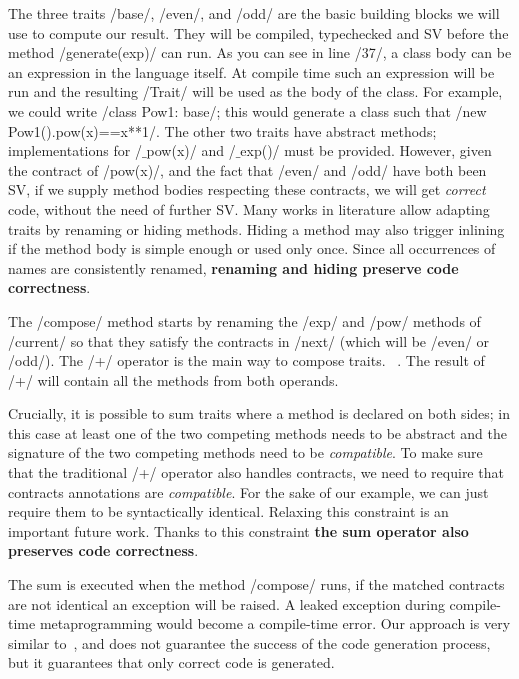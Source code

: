 The three traits /base/, /even/, and /odd/ are the basic building blocks we will use to compute our result. They will be compiled, typechecked and SV before the method /generate(exp)/ can run.
As you can see in line /37/, a class body can be an expression in the language itself.
At compile time such an expression will be run and the resulting /Trait/ will be used as the body of the class.
For example, we could write /class Pow1: base/; this would generate a class such that /new Pow1().pow(x)==x**1/.
The other two traits have abstract methods; implementations for /$\_$pow(x)/ and /$\_$exp()/ must be provided. However, given the contract of /pow(x)/,
and the fact that /even/ and /odd/ have both been SV,
if we supply method bodies respecting these contracts, we will get \emph{correct} code, without the need of further SV.
Many works in literature allow adapting traits by renaming or hiding methods\cite{servetto2014meta,reppy2007metaprogramming,liquori2008feathertrait}. Hiding a method may also trigger inlining if the method body is simple enough or used only once.
Since all occurrences of names are consistently renamed, \textbf{renaming and hiding preserve code correctness}.

The /compose/ method starts by renaming the /exp/ and /pow/ methods of /current/
so that they satisfy the contracts in /next/ (which will be 
/even/ or /odd/).
The /+/ operator is the main way to compose traits.%
~\cite{scharli2003traits,LagorioSZ09}.
The result of /+/ will contain all the methods from both operands.

Crucially, it is possible to sum traits where a method is declared on both sides; in this case at least one of the two competing methods needs to be abstract and the signature of the two competing methods need to be \emph{compatible}.
To make sure that the traditional /+/ operator also handles contracts, we need to require that contracts annotations are \emph{compatible}.
For the sake of our example, we can just require them to be syntactically identical. Relaxing this constraint is an important future work.
Thanks to this constraint \textbf{the sum operator also preserves code correctness}.

The sum is executed when the method /compose/ runs, if the matched contracts are not identical an exception will be raised. A leaked exception during compile-time metaprogramming would become a compile-time error. 
Our approach is very similar to~\cite{servetto2014meta}, and does not guarantee the success of the code generation process, but it guarantees that only correct code is generated.

